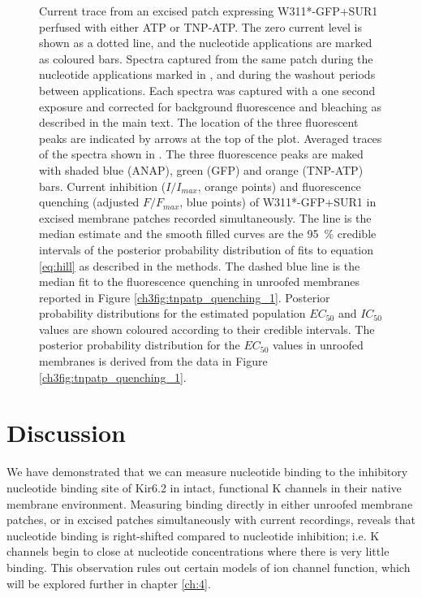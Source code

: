 \begin{figure}[hbtp]
\begin{subfigure}[t]{0.45\textwidth}
	\end{subfigure}
	\caption[ANAP is not quenched by ATP]{
	 Current trace from an excised patch expressing W311*-GFP+SUR1 perfused with either ATP or TNP-ATP.
	The zero current level is shown as a dotted line, and the nucleotide applications are marked as coloured bars.
	 Spectra captured from the same patch during the nucleotide applications marked in , and during the washout periods between applications.
	Each spectra was captured with a one second exposure and corrected for background fluorescence and bleaching as described in the main text.
	The location of the three fluorescent peaks are indicated by arrows at the top of the plot.
	 Averaged traces of the spectra shown in .
	The three fluorescence peaks are maked with shaded blue (ANAP), green (GFP) and orange (TNP-ATP) bars.
	 Current inhibition ($I/I_{max}$, orange points) and fluorescence quenching (adjusted $F/F_{max}$, blue points) of W311*-GFP+SUR1 in excised membrane patches recorded simultaneously.
	The line is the median estimate and the smooth filled curves are the \SI{95}{\percent} credible intervals of the posterior probability distribution of fits to equation \ref{eq:hill} as described in the methods.
	The dashed blue line is the median fit to the fluorescence quenching in unroofed membranes reported in Figure \ref{ch3fig:tnpatp_quenching_1}.
	 Posterior probability distributions for the estimated population $EC_{50}$ and $IC_{50}$ values are shown coloured according to their credible intervals.
	The posterior probability distribution for the $EC_{50}$ values in unroofed membranes is derived from the data in Figure \ref{ch3fig:tnpatp_quenching_1}.
	}\label{ch3fig:pcf_intro_1}
\end{figure}

\section{Discussion}

We have demonstrated that we can measure nucleotide binding to the inhibitory nucleotide binding site of Kir6.2 in intact, functional K\ATP{} channels in their native membrane environment.
Measuring binding directly in either unroofed membrane patches, or in excised patches simultaneously with current recordings, reveals that nucleotide binding is right-shifted compared to nucleotide inhibition; i.e. K\ATP{} channels begin to close at nucleotide concentrations where there is very little binding.
This observation rules out certain models of ion channel function, which will be explored further in chapter \ref{ch:4}.

